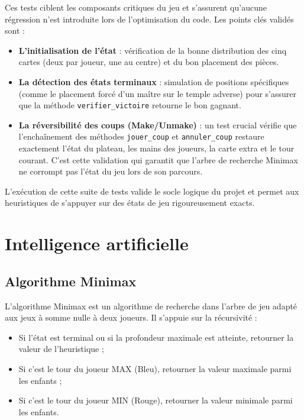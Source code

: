 \documentclass[12pt, a4paper]{article}
\begin{document}
Ces tests ciblent les composants critiques du jeu et s'assurent qu'aucune régression
n'est introduite lors de l'optimisation du code. Les points clés validés sont :

\begin{itemize}
  \item \textbf{L'initialisation de l'état} : vérification de la bonne distribution des cinq
        cartes (deux par joueur, une au centre) et du bon placement des pièces.
  \item \textbf{La détection des états terminaux} : simulation de positions spécifiques 
        (comme le placement forcé d'un maître sur le temple adverse) pour s'assurer que
        la méthode \texttt{verifier\_victoire} retourne le bon gagnant.
  \item \textbf{La réversibilité des coups (Make/Unmake)} : un test crucial vérifie que l'enchaînement
        des méthodes \texttt{jouer\_coup} et \texttt{annuler\_coup} restaure exactement l'état
        du plateau, les mains des joueurs, la carte extra et le tour courant. C'est cette validation qui 
        garantit que l'arbre de recherche Minimax ne corrompt pas l'état du jeu lors de son parcours.
\end{itemize}

L'exécution de cette suite de tests valide le socle logique du projet et permet aux heuristiques
de s'appuyer sur des états de jeu rigoureusement exacts.

\section{Intelligence artificielle}
\label{sec:ia}

\subsection{Algorithme Minimax}

L'algorithme Minimax est un algorithme de recherche dans l'arbre de jeu adapté aux jeux à
somme nulle à deux joueurs. Il s'appuie sur la récursivité :

\begin{itemize}
  \item Si l'état est terminal ou si la profondeur maximale est atteinte, retourner la valeur
        de l'heuristique ;
  \item Si c'est le tour du joueur MAX (Bleu), retourner la valeur maximale parmi les enfants ;
  \item Si c'est le tour du joueur MIN (Rouge), retourner la valeur minimale parmi les enfants.
\end{itemize}
\end{document}
